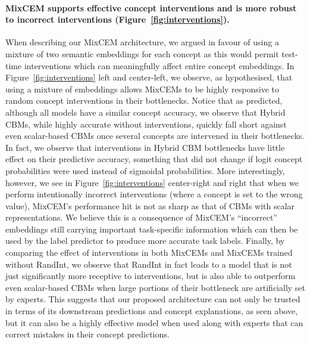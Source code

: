 \paragraph{MixCEM supports effective concept interventions and is more robust to incorrect interventions (Figure~\ref{fig:interventions}).} When describing our MixCEM architecture, we argued in favour of using a mixture of two semantic embeddings for each concept as this would permit test-time interventions which can meaningfully affect entire concept embeddings. In Figure~\ref{fig:interventions} left and center-left, we observe, as hypothesised, that using a mixture of embeddings allows MixCEMs to be highly responsive to random concept interventions in their bottlenecks. Notice that as predicted, although all models have a similar concept accuracy, we observe that Hybrid CBMs, while highly accurate without interventions, quickly fall short against even scalar-based CBMs once several concepts are intervened in their bottlenecks. In fact, we observe that interventions in Hybrid CBM bottlenecks have little effect on their predictive accuracy, something that did not change if logit concept probabilities were used instead of sigmoidal probabilities. More interestingly, however, we see in Figure~\ref{fig:interventions} center-right and right that when we perform intentionally incorrect interventions (where a concept is set to the wrong value), MixCEM's performance hit is not as sharp as that of CBMs with scalar representations. We believe this is a consequence of MixCEM's ``incorrect'' embeddings still carrying important task-specific information which can then be used by the label predictor to produce more accurate task labels. Finally, by comparing the effect of interventions in both MixCEMs and MixCEMs trained without RandInt, we observe that RandInt in fact leads to a model that is not just significantly more receptive to interventions, but is also able to outperform even scalar-based CBMs when large portions of their bottleneck are artificially set by experts. This suggests that our proposed architecture can not only be trusted in terms of its downstream predictions and concept explanations, as seen above, but it can also be a highly effective model when used along with experts that can correct mistakes in their concept predictions.


